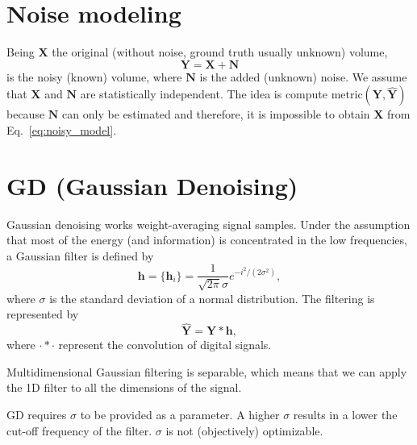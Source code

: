 \documentclass{article}
\begin{document}
\section{Noise modeling}

Being $\mathbf{X}$ the original (without noise, ground truth usually unknown) volume,
\begin{equation}
  \mathbf{Y} = \mathbf{X} + \mathbf{N}
  \label{eq:noisy_model}
\end{equation}
is the noisy (known) volume, where $\mathbf{N}$ is the added (unknown)
noise. We assume that $\mathbf{X}$ and $\mathbf{N}$ are statistically
independent. The idea is compute
$\text{metric}(\mathbf{Y}, \hat{\mathbf{Y}})$ because $\mathbf{N}$ can
only be estimated and therefore, it is impossible to obtain
$\mathbf{X}$ from Eq.~\ref{eq:noisy_model}.

\section{GD (Gaussian Denoising)}

Gaussian denoising works weight-averaging signal samples. Under the
assumption that most of the energy (and information) is concentrated
in the low frequencies, a Gaussian filter is defined by
\begin{equation}
  \mathbf{h} = \{\mathbf{h}_i\} = \frac{1}{\sqrt{2\pi}\sigma}e^{{-i}^2/(2\sigma^2)},
\end{equation}
where $\sigma$ is the standard deviation of a normal distribution. The
filtering is represented by
\begin{equation}
  \hat{\mathbf{Y}} = \mathbf{Y}*\mathbf{h},
  \label{eq:GF}
\end{equation}
where $\cdot*\cdot$ represent the convolution of digital signals.

Multidimensional Gaussian filtering is separable, which means that we
can apply the 1D filter to all the dimensions of the signal.

GD requires $\sigma$ to be provided as a parameter. A higher $\sigma$
results in a lower the cut-off frequency of the filter. $\sigma$ is
not (objectively) optimizable.


\end{document}
